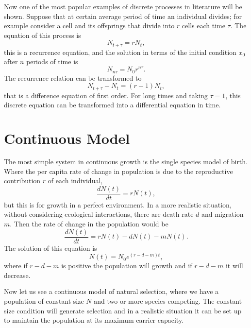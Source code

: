   
Now one of the most popular examples of discrete processes in literature will be shown. Suppose that at certain average period of time an individual divides; for example consider a cell and its offsprings that divide into  $r$ cells each time $\tau$. The  equation of this process is
\begin{equation}
N_{t+\tau}=rN_{t},
\end{equation} 
this is a recurrence equation, and the solution in terms of the initial condition $x_{0}$ after $n$ periods of time is
\begin{equation}
N_{n\tau}=N_{0}r^{n\tau}.
\end{equation}
The recurrence relation can be transformed to 
\begin{equation}
N_{t+\tau}-N_{t}=(r-1)N_{t},
\end{equation}
that is a difference equation of first order. 
For long times and taking $\tau=1$, this discrete equation can be transformed into a differential equation in time. 
\section{Continuous Model}
The most simple system in continuous growth is the single species model of birth. Where the per capita rate of change in population is due to the reproductive contribution $r$ of each individual,
\begin{equation}
\frac{dN(t)}{dt}=rN(t),
\end{equation} 
but this is for growth in a perfect environment. In a more realistic situation, without considering ecological interactions, there are death rate $d$ and migration $m$. Then the rate of change in the population would be 
\begin{equation}
\frac{dN(t)}{dt}=rN(t)-dN(t)-mN(t).
\end{equation}
 The solution of this equation is
 \begin{equation}
 N(t)=N_{0}e^{(r-d-m)t},
 \end{equation}
 where if $r-d-m$ is positive the population will growth and if $r-d-m$ it will decrease.
 
 Now let us see a continuous model of natural selection, where we have a population of constant size $N$ and two or more species competing. The constant size condition will generate selection and in a realistic situation it can be set up to maintain the population  at its maximum carrier capacity.
 
